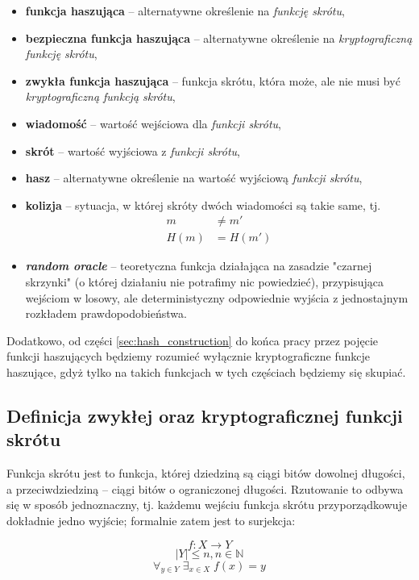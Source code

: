 \documentclass[12pt,a4paper,twoside]{article}
\begin{document}
\begin{itemize}
\item \textbf{funkcja haszująca} -- alternatywne określenie na \emph{funkcję
skrótu},
\item \textbf{bezpieczna funkcja haszująca} -- alternatywne określenie na
\emph{kryptograficzną funkcję skrótu},
\item \textbf{zwykła funkcja haszująca} -- funkcja skrótu, która może, ale nie
musi być \emph{kryptograficzną funkcją skrótu},
\item \textbf{wiadomość} -- wartość wejściowa dla \emph{funkcji skrótu},
\item \textbf{skrót} -- wartość wyjściowa z \emph{funkcji skrótu},
\item \textbf{hasz} -- alternatywne określenie na wartość wyjściową
\emph{funkcji skrótu},
\item \textbf{kolizja} -- sytuacja, w której skróty dwóch wiadomości są takie
same, tj.
\[
    \begin{aligned}
    m &\neq m' \\
    H(m) &= H(m')
    \end{aligned}
\]
\item \textbf{\textit{random oracle}} -- teoretyczna funkcja działająca na
zasadzie "czarnej skrzynki" (o której działaniu nie potrafimy nic powiedzieć),
przypisująca wejściom w losowy, ale deterministyczny odpowiednie wyjścia z
jednostajnym rozkładem prawdopodobieństwa.
\end{itemize}

Dodatkowo, od części \ref{sec:hash_construction} do końca pracy przez pojęcie
funkcji haszujących będziemy rozumieć wyłącznie kryptograficzne funkcje
haszujące, gdyż tylko na takich funkcjach w tych częściach będziemy się
skupiać.
\pagebreak



\subsection{Definicja zwykłej oraz kryptograficznej funkcji skrótu}

Funkcja skrótu jest to funkcja, której dziedziną są ciągi bitów dowolnej
długości, a przeciwdziedziną -- ciągi bitów o ograniczonej długości. Rzutowanie
to odbywa się w sposób jednoznaczny, tj. każdemu wejściu funkcja skrótu
przyporządkowuje dokładnie jedno wyjście; formalnie zatem jest to surjekcja:

$$ f \colon X \to Y $$
$$ |Y| \leq n, n \in \mathbb{N} $$
$$ \forall_{y \in Y} \; \exists_{x \in X} \; f(x)=y$$
\end{document}
